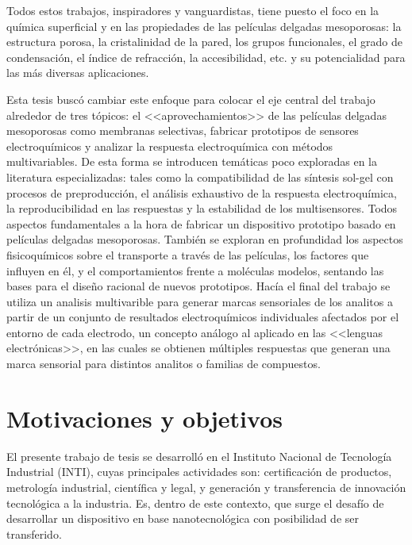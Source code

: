	Todos estos trabajos, inspiradores y vanguardistas, tiene puesto el foco en la química superficial y en las propiedades de las películas delgadas mesoporosas: la estructura porosa, la cristalinidad de la pared, los grupos funcionales, el grado de condensación, el índice de refracción, la accesibilidad, etc. y su potencialidad para las más diversas aplicaciones.

	Esta tesis buscó cambiar este enfoque para colocar el eje central del trabajo alrededor de tres tópicos: el <<aprovechamientos>> de las películas delgadas mesoporosas como membranas selectivas, fabricar prototipos de sensores electroquímicos y analizar la respuesta electroquímica con métodos multivariables. De esta forma se introducen temáticas poco exploradas en la literatura especializadas: tales como la compatibilidad de las síntesis sol-gel con procesos de preproducción, el análisis exhaustivo de la respuesta electroquímica, la reproducibilidad en las respuestas y la estabilidad de los multisensores. Todos aspectos fundamentales a la hora de fabricar un dispositivo prototipo basado en películas delgadas mesoporosas. También se exploran en profundidad los aspectos fisicoquímicos sobre el transporte a través de las películas, los factores que influyen en él, y el comportamientos frente a moléculas modelos, sentando las bases para el diseño racional de nuevos prototipos. Hacía el final del trabajo se utiliza un analisis multivarible para generar marcas sensoriales de los analitos a partir de un conjunto de resultados electroquímicos individuales afectados por el entorno de cada electrodo, un concepto análogo al aplicado en las <<lenguas electrónicas>>,\cite{Ciosek2007,mimendia2010,tahara2013} en las cuales se obtienen múltiples respuestas que generan una marca sensorial para distintos analitos o familias de compuestos.
	    	 		    	
\section{Motivaciones y objetivos}

	El presente trabajo de tesis se desarrolló en el Instituto Nacional de Tecnología Industrial (INTI), cuyas principales actividades son: certificación de productos, metrología industrial, científica y legal, y generación y transferencia	de innovación tecnológica a la industria. Es, dentro de este contexto, que surge el desafío de desarrollar un dispositivo en base nanotecnológica con posibilidad de ser transferido. 

